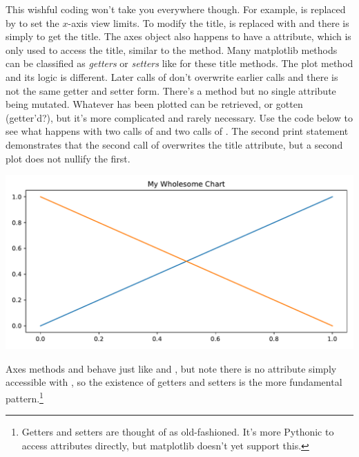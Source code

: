This wishful coding won't take you everywhere though. For example,  is replaced by  to set the $x$-axis view limits. To modify the title,  is replaced with  and there is  simply to get the title. The axes object also happens to have a  attribute, which is only used to access the title, similar to the  method. Many matplotlib methods can be classified as \emph{getters} or \emph{setters} like for these title methods. The plot method and its logic is different. Later calls of  don't overwrite earlier calls and there is not the same getter and setter form. There's a  method but no single  attribute being mutated. Whatever has been plotted can be retrieved, or gotten (getter'd?), but it's more complicated and rarely necessary. Use the code below to see what happens with two calls of  and two calls of . The second print statement demonstrates that the second call of  overwrites the title attribute, but a second plot does not nullify the first.



\begin{center}
    \includegraphics[width = .7\textwidth]{figures/proseplots/gettersetter.pdf}
\end{center}

Axes methods  and  behave just like  and , but note there is no attribute simply accessible with , so the existence of getters and setters is the more fundamental pattern.\footnote{Getters and setters are thought of as old-fashioned. It's more Pythonic to access attributes directly, but matplotlib doesn't yet support this.}

